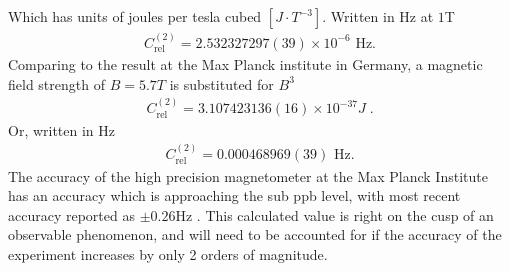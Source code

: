         \noindent Which has units of joules per tesla cubed $\left[J \cdot T^{-3}\right]$. Written in Hz at $1$T
        \begin{align}
            C_{\text{rel}}^{(2)} =2.532327297(39)\times 10^{-6} \text{  Hz.}
        \end{align}
        \noindent Comparing to the result at the Max Planck institute in Germany, a magnetic field strength of $B = 5.7T$ is substituted for $B^3$
        \begin{align}
            C_{\text{rel}}^{(2)} = 3.107423136(16)\times10^{-37} J\;.
        \end{align}
        \noindent Or, written in Hz
        \begin{align}
            C_{\text{rel}}^{(2)} = 0.000468969(39) \text{  Hz.}
        \end{align}
        \noindent The accuracy of the high precision magnetometer at the Max Planck Institute has an accuracy which is approaching the sub ppb level, with most recent accuracy reported as $\pm 0.26$Hz \cite{Schneider_Sikora_Dickopf_Müller_Oreshkina_Rischka_Valuev_Ulmer_Walz_Harman_et_al._2022}. This calculated value is right on the cusp of an observable phenomenon, and will need to be accounted for if the accuracy of the experiment increases by only 2 orders of magnitude.